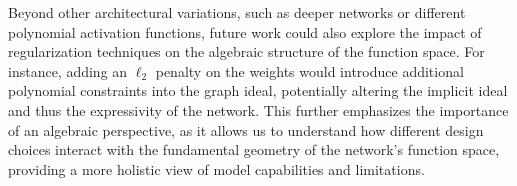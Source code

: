 Beyond other architectural variations, such as deeper networks or different polynomial activation functions, future work could also explore the impact of regularization techniques on the algebraic structure of the function space. For instance, adding an $\ell_2$ penalty on the weights would introduce additional polynomial constraints into the graph ideal, potentially altering the implicit ideal and thus the expressivity of the network. This further emphasizes the importance of an algebraic perspective, as it allows us to understand how different design choices interact with the fundamental geometry of the network's function space, providing a more holistic view of model capabilities and limitations.
